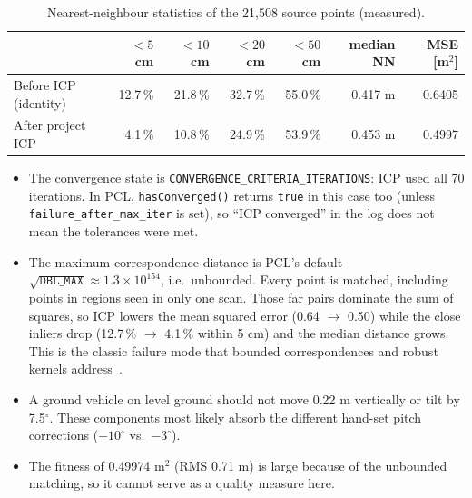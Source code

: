\documentclass[10pt,a4paper]{scrartcl}
\renewcommand{\emph}[1]{\textcolor{accent}{#1}}
\newcommand{\code}[1]{\texttt{#1}}
\begin{document}
  \begin{table}[H]
  \small
  \centering
  \renewcommand{\arraystretch}{1.05}
  \begin{tabular}{@{}lrrrrrr@{}}
  \toprule
  & $<5$ cm & $<10$ cm & $<20$ cm & $<50$ cm & median NN & MSE [m$^2$] \\
  \midrule
  Before ICP (identity) & 12.7\,\% & 21.8\,\% & 32.7\,\% & 55.0\,\% & 0.417 m & 0.6405 \\
  After project ICP     &  4.1\,\% & 10.8\,\% & 24.9\,\% & 53.9\,\% & 0.453 m & 0.4997 \\
  \bottomrule
  \end{tabular}
  \caption{Nearest-neighbour statistics of the 21,508 source points (measured).}
  \label{tab:inliers}
  \end{table}

  \begin{warnbox}
  \small
  \begin{itemize}
    \item The convergence state is \code{CONVERGENCE\_CRITERIA\_ITERATIONS}: ICP used all 70
      iterations. In PCL, \code{hasConverged()} returns \code{true} in this case too
      (unless \code{failure\_after\_max\_iter} is set), so ``ICP converged'' in the log does
      not mean the tolerances were met.
    \item The maximum correspondence distance is PCL's default
      $\sqrt{\texttt{DBL\_MAX}}\approx1.3\times10^{154}$, i.e.\ unbounded. Every point is
      matched, including points in regions seen in only one scan. Those far pairs dominate
      the sum of squares, so ICP lowers the \emph{mean} squared error (0.64 $\to$ 0.50)
      while the close inliers \emph{drop} (12.7\,\% $\to$ 4.1\,\% within 5 cm) and the
      median distance grows. This is the classic failure mode that bounded correspondences
      and robust kernels address~\citep{rusinkiewicz2001efficient,pomerleau2015review}.
    \item A ground vehicle on level ground should not move 0.22 m vertically or tilt by
      7.5$^\circ$. These components most likely absorb the different hand-set pitch
      corrections ($-10^\circ$ vs.\ $-3^\circ$).
    \item The fitness of 0.49974 m$^2$ (RMS 0.71 m) is large \emph{because} of the
      unbounded matching, so it cannot serve as a quality measure here.
  \end{itemize}
  \end{warnbox}
\end{document}
